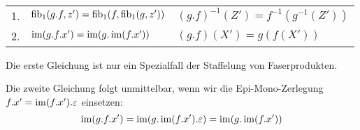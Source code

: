 \begin{lemm}[Regel (d)]
\ \linebreak

\begin{tabular}{rll}
   1.
&  $\operatorname{fib}_1(g.f, z') = \operatorname{fib}_1(f, \operatorname{fib}_1(g, z'))$
&  $(g.f)^{-1}(Z') = f^{-1}(g^{-1}(Z'))$
\\ 2.
&  $\operatorname{im}(g.f.x') = \operatorname{im}(g.\operatorname{im}(f.x'))$
&  $(g.f)(X') = g(f(X'))$
\end{tabular}
\end{lemm}
\begin{bew}
Die erste Gleichung ist nur ein Spezialfall der Staffelung von Faserprodukten.

Die zweite Gleichung folgt unmittelbar, wenn wir die Epi-Mono-Zerlegung $f.x' = \operatorname{im}(f.x').\varepsilon$ einsetzen:
\[\operatorname{im}(g.f.x') = \operatorname{im}(g.\operatorname{im}(f.x').\varepsilon) = \operatorname{im}(g.\operatorname{im}(f.x')) \]
\end{bew}

